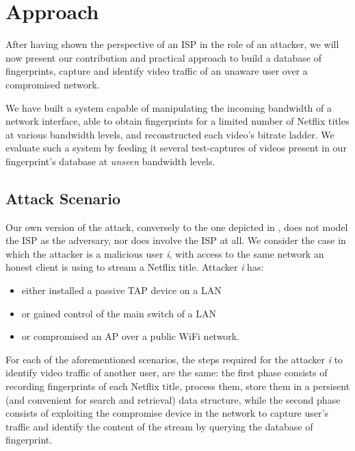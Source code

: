 \chapter{Approach}\label{sec:approach}

After having shown the perspective of an ISP in the role of an attacker, we
will now present our contribution and practical approach to build a database of
fingerprints, capture and identify video traffic of an unaware user
over a compromised network. 

We have built a system capable of manipulating the incoming bandwidth of a
network interface, able to obtain fingerprints for a limited number of Netflix
titles at various bandwidth levels, and reconstructed each video's bitrate
ladder. We evaluate such a system by feeding it several test-captures of videos
present in our fingerprint's database at \emph{unseen} bandwidth levels.

\section{Attack Scenario}

Our own version of the attack, conversely to the one depicted in
, does not model the ISP as the adversary, nor does involve
the ISP at all. We consider the case in which the attacker is a malicious user
\emph{i}, with access to the same network an honest client is using to stream a
Netflix title. Attacker \emph{i} has:

\begin{itemize}
    \item either installed a passive TAP device on a LAN
    \item or gained control of the main switch of a LAN
    \item or compromised an AP over a public WiFi network.
\end{itemize}


For each of the aforementioned scenarios, the steps required for the attacker
\emph{i} to identify video traffic of another user, are the same: the first
phase consists of recording fingerprints of each Netflix title, process them,
store them in a persisent (and convenient for search and retrieval) data
structure, while the second phase consists of exploiting the compromise device
in the network to capture user's traffic and identify the content of the stream
by querying the database of fingerprint.

